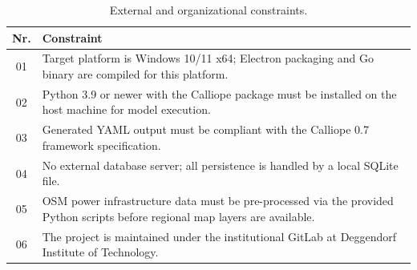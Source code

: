 \vfill
\begin{table}[h!]
    \centering
    \caption{External and organizational constraints.}
    \begin{tabular}{c p{11cm}} 
        \toprule
        Nr. & Constraint \\ [0.5ex] 
        \midrule
        01 & Target platform is Windows 10/11 x64; Electron packaging and Go binary are compiled for this platform. \\ [1ex]
        02 & Python 3.9 or newer with the Calliope package must be installed on the host machine for model execution. \\ [1ex]
        03 & Generated YAML output must be compliant with the Calliope 0.7 framework specification. \\ [1ex]
        04 & No external database server; all persistence is handled by a local SQLite file. \\ [1ex]
        05 & OSM power infrastructure data must be pre-processed via the provided Python scripts before regional map layers are available. \\ [1ex]
        06 & The project is maintained under the institutional GitLab at Deggendorf Institute of Technology. \\ [1ex]
        \bottomrule
    \end{tabular}
    \label{table:2}
\end{table}
\vfill